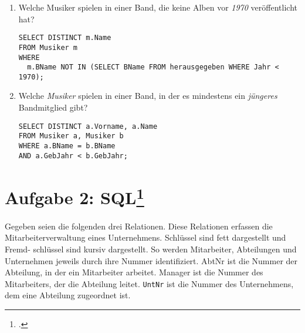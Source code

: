 \documentclass{lehramt-informatik-haupt}
\begin{document}
\begin{enumerate}
\begin{antwort}[muster]
\begin{verbatim}
SELECT DISTINCT m.Name, m.Vorname
FROM Band b, Musiker m
WHERE
  b.BName = m.BName AND
  b.aktiv = 1
ORDER By m.Name, m.Vorname ASC;
\end{verbatim}
\end{antwort}


\item Welche Musiker spielen in einer Band, die keine Alben vor
\emph{1970} veröffentlicht hat?

\begin{antwort}[muster]
\begin{verbatim}
SELECT DISTINCT m.Name
FROM Musiker m
WHERE
  m.BName NOT IN (SELECT BName FROM herausgegeben WHERE Jahr < 1970);
\end{verbatim}
\end{antwort}


\item Welche \emph{Musiker} spielen in einer Band, in der es
mindestens ein \emph{jüngeres} Bandmitglied gibt?

\begin{antwort}[muster]
\begin{verbatim}
SELECT DISTINCT a.Vorname, a.Name
FROM Musiker a, Musiker b
WHERE a.BName = b.BName
AND a.GebJahr < b.GebJahr;
\end{verbatim}
\end{antwort}

\end{enumerate}

%

\section{Aufgabe 2: SQL\footcite{db:pu:2}}

Gegeben seien die folgenden drei Relationen. Diese Relationen erfassen
die Mitarbeiterverwaltung eines Unternehmens. Schlüssel sind fett
dargestellt und Fremd- schlüssel sind kursiv dargestellt. So werden
Mitarbeiter, Abteilungen und Unternehmen jeweils durch ihre Nummer
identifiziert. AbtNr ist die Nummer der Abteilung, in der ein
Mitarbeiter arbeitet. Manager ist die Nummer des Mitarbeiters, der die
Abteilung leitet. \verb|UntNr| ist die Nummer des Unternehmens, dem eine
Abteilung zugeordnet ist.
\end{document}
